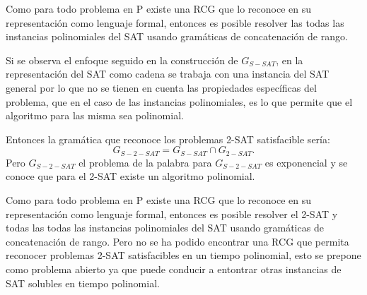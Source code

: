 Como para todo problema en P existe una RCG que lo reconoce en su representación como lenguaje formal,
entonces es posible resolver las todas las instancias polinomiales del SAT usando gramáticas de
concatenación de rango.

Si se observa el enfoque seguido en la construcción de $G_{S-SAT}$, en la representación del SAT como cadena se
trabaja con una instancia del SAT general por lo que no se tienen en cuenta las propiedades específicas
del problema, que en el caso de las instancias polinomiales, es lo que permite que el algoritmo para las
misma sea polinomial.

Entonces la gramática que reconoce los problemas 2-SAT satisfacible sería:
$$G_{S-2-SAT}=G_{S-SAT}\cap G_{2-SAT}.$$
Pero $G_{S-2-SAT}$ el problema de la palabra para $G_{S-2-SAT}$ es exponencial y se conoce que para el 2-SAT
existe un algoritmo polinomial.

Como para todo problema en P existe una RCG que lo reconoce en su representación como lenguaje formal,
entonces es posible resolver el 2-SAT y todas las todas las instancias polinomiales del SAT usando gramáticas de
concatenación de rango. Pero no se ha podido encontrar una RCG que permita reconocer problemas 2-SAT satisfacibles
en un tiempo polinomial, esto se prepone como problema abierto ya que puede conducir a entontrar otras instancias 
de SAT solubles en tiempo polinomial.





